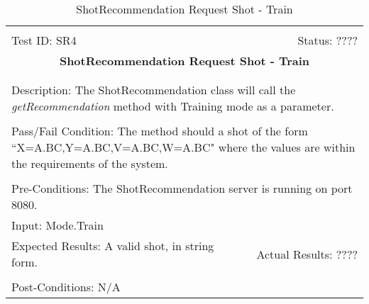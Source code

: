 \documentclass[11pt]{article}
\begin{document}
\begin{center}
\begin{table}[H]
\begin{tabular}{|l r|}\hline&\\[-2mm]
	Test ID: SR4	&Status: ????\\[-3mm]
	\multicolumn{2}{|c|}{\textbf{\large{ShotRecommendation Request Shot - Train}}}\\&\\\hline&\\[-3mm]
	\multicolumn{2}{|p{\textwidth}|}{Description: The ShotRecommendation class will call the \textit{getRecommendation} method with Training mode as a parameter.}\\[1mm]\hline&\\[-3mm]
	\multicolumn{2}{|p{\textwidth}|}{Pass/Fail Condition: The method should a shot of the form ``X=A.BC,Y=A.BC,V=A.BC,W=A.BC" where the values are within the requirements of the system.}\\[1mm]\hline&\\[-3mm]
	\multicolumn{2}{|p{\textwidth}|}{Pre-Conditions: The ShotRecommendation server is running on port 8080.}\\[4mm]
	\multicolumn{2}{|p{\textwidth}|}{Input: Mode.Train}\\[2mm]\hline
	\multicolumn{1}{|p{0.49\textwidth}}{Expected Results: A valid shot, in string form.}	&\multicolumn{1}{|p{0.45\textwidth}|}{Actual Results: ????}\\\hline&\\[-3mm]
	\multicolumn{2}{|p{\textwidth}|}{Post-Conditions: N/A}\\\hline
\end{tabular}
\caption{ShotRecommendation Request Shot - Train}
\end{table}
\end{center}
\end{document}
